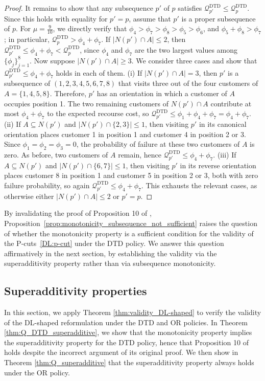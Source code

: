 \documentclass{article}
\newcommand{\rev}[1]{{\color{black}#1}}
\begin{document}
{\begin{proof}
It remains to show that any subsequence $p'$ of $p$ satisfies $\mathcal{Q}^{\mathrm{DTD}}_{p'}\leq \mathcal{Q}^{\mathrm{DTD}}_p$. Since this holds with equality for $p'=p$, assume that $p'$ is a proper subsequence of $p$. For $\mu=\frac{9}{10}$, we directly verify that $\phi_4 > \phi_7 > \phi_8 > \phi_5 > \phi_6$, and $\phi_5 + \phi_8 > \phi_7$; in particular, $\mathcal{Q}^{\mathrm{DTD}}_p > \phi_4+\phi_7$. If $|N(p')\cap A|\leq 2$, then $\mathcal{Q}^{\mathrm{DTD}}_{p'}\leq \phi_4+\phi_7<\mathcal{Q}^{\mathrm{DTD}}_p$, since $\phi_4$ and $\phi_7$ are the two largest values among $\{\phi_j\}_{j=1}^8$. Now suppose $|N(p')\cap A|\geq 3$. We consider three cases and show that $\mathcal{Q}^{\mathrm{DTD}}_{p'} \leq \phi_4 + \phi_7$ holds in each of them. (i) If $|N(p')\cap A|=3$, then $p'$ is a subsequence of $(1,2,3,4,5,6,7,8)$ that visits three out of the four customers of $A=\{1,4,5,8\}$. Therefore, $p'$ has an orientation in which a customer of $A$ occupies position 1. The two remaining customers of $N(p')\cap A$ contribute at most $\phi_4+\phi_7$ to the expected recourse cost, so $\mathcal{Q}^{\text{DTD}}_{p'} \leq \phi_1 + \phi_4 + \phi_7 = \phi_4 + \phi_7$. (ii) If $A \subseteq N(p')$ and $|N(p') \cap \{2,3\}| \leq 1$, then visiting $p'$ in its canonical orientation places customer 1 in position 1 and customer 4 in position 2 or 3. Since $\phi_1=\phi_2=\phi_3=0$, the probability of failure at these two customers of $A$ is zero. As before, two customers of $A$ remain, hence $\mathcal{Q}^{\text{DTD}}_{p'} \leq \phi_4 + \phi_7$. (iii) If $A \subseteq N(p')$ and $|N(p') \cap \{6,7\}| \leq 1$, then visiting $p'$ in its reverse orientation places customer 8 in position 1 and customer 5 in position 2 or 3, both with zero failure probability, so again $\mathcal{Q}^{\text{DTD}}_{p'} \leq \phi_4 + \phi_7$. This exhausts the relevant cases, as otherwise either $|N(p')\cap A|\leq 2$ or $p'=p$. 
\end{proof}
}

\rev{By invalidating the proof of Proposition 10 of \cite{parada2024disaggregated}, Proposition~\ref{prop:monotonicity_subsequence_not_sufficient} raises the question of whether the monotonicity property is a sufficient condition for the validity of the P-cuts~\eqref{DL:p-cut} under the DTD policy. We answer this question affirmatively in the next section, by establishing the validity via the superadditivity property rather than via subsequence monotonicity.}

\subsection{Superadditivity properties}\label{sec:properties:superadditivity}
In this section, we apply Theorem \ref{thm:validity_DL-shaped} to verify the validity of the DL-shaped reformulation under the DTD and OR policies. In Theorem \ref{thm:Q_DTD_superadditive}, we show that the monotonicity property implies the superadditivity property for the DTD policy, hence that Proposition 10 of \cite{parada2024disaggregated} holds despite the incorrect argument of its original proof. We then show in Theorem \ref{thm:Q_superadditive} that the superadditivity property always holds under the OR policy.
\end{document}
